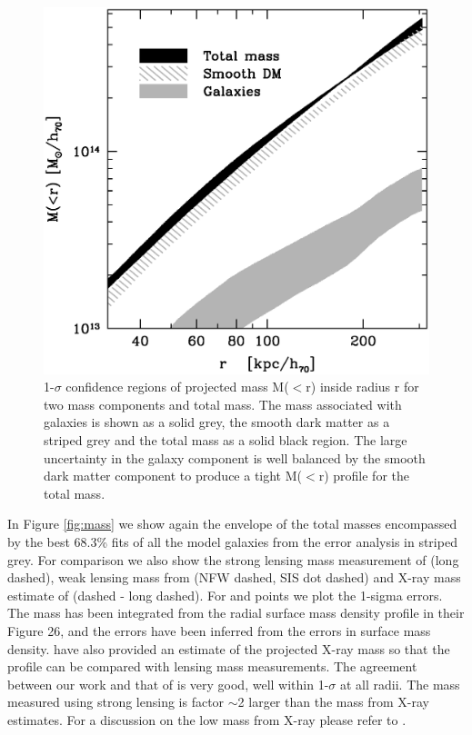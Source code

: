 \documentclass[useAMS,usenatbib]{mn2e}
\newcounter{one}   \setcounter{one}{1}
\newcounter{two}   \setcounter{two}{2}
\begin{document}
\begin{figure}
  \centering \includegraphics[width=\columnwidth]{figs/mass_components_gbbs.ps}
  \caption{1-$\sigma$ confidence regions of projected mass M($<$r)
  inside radius r for two mass components and total mass. The mass
  associated with galaxies is shown as a solid grey, the smooth dark
  matter as a striped grey and the total mass as a solid black
  region. The large uncertainty in the galaxy component is well
  balanced by the smooth dark matter component to produce a tight
  M($<$r) profile for the total mass.}
  \label{fig:mass_components}
\end{figure}

In Figure \ref{fig:mass} we show again the envelope of the total
masses encompassed by the best 68.3\% fits of all the model galaxies
from the error analysis in striped grey. For comparison we also show
the strong lensing mass measurement of \citet{broadhurst:05} (long
dashed), weak lensing mass from \citet{king:02b} (NFW dashed, SIS dot
dashed) and X-ray mass estimate of \citet{andersson:04} (dashed - long
dashed). For \citet{broadhurst:05} and \citet{andersson:04} points we
plot the 1-sigma errors. The \citet{broadhurst:05} mass has been
integrated from the radial surface mass density profile in their
Figure 26, and the errors have been inferred from the errors in
surface mass density. \citet{andersson:04} have also provided an
estimate of the projected X-ray mass so that the profile can be
compared with lensing mass measurements. The agreement between our
work and that of \citet{broadhurst:05} is very good, well within
1-$\sigma$ at all radii. The mass measured using strong lensing is
factor $\sim$2 larger than the mass from X-ray estimates. For a
discussion on the low mass from X-ray please refer to
\citet{andersson:04}.\\
\end{document}
